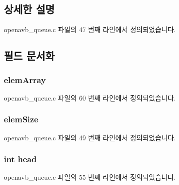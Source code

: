 \subsection{상세한 설명}


openavb\+\_\+queue.\+c 파일의 47 번째 라인에서 정의되었습니다.



\subsection{필드 문서화}
\subsubsection[{\texorpdfstring{elem\+Array}{elemArray}}]{ elem\+Array}\hypertarget{structopenavb__queue_aa873c90780da304face067f158fb98b6}{}\label{structopenavb__queue_aa873c90780da304face067f158fb98b6}


openavb\+\_\+queue.\+c 파일의 60 번째 라인에서 정의되었습니다.

\subsubsection[{\texorpdfstring{elem\+Size}{elemSize}}]{ elem\+Size}\hypertarget{structopenavb__queue_a838e119281056414fd5e0641cf388263}{}\label{structopenavb__queue_a838e119281056414fd5e0641cf388263}


openavb\+\_\+queue.\+c 파일의 49 번째 라인에서 정의되었습니다.

\subsubsection[{\texorpdfstring{head}{head}}]{\setlength{\rightskip}{0pt plus 5cm}int head}\hypertarget{structopenavb__queue_a20358970b1abaf992eb85e071e454653}{}\label{structopenavb__queue_a20358970b1abaf992eb85e071e454653}


openavb\+\_\+queue.\+c 파일의 55 번째 라인에서 정의되었습니다.

